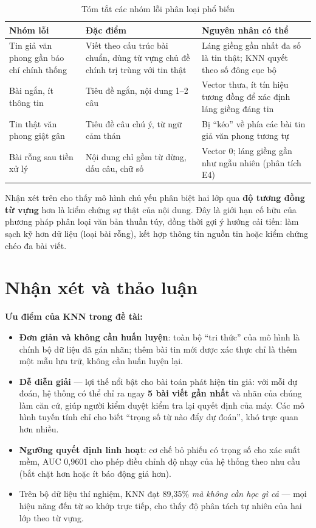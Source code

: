 \begin{table}[H]
\centering
\caption{Tóm tắt các nhóm lỗi phân loại phổ biến}
\label{tab:phan-tich-loi}
\begin{tabular}{|p{4.5cm}|p{5cm}|p{3.5cm}|}
\hline
\textbf{Nhóm lỗi} & \textbf{Đặc điểm} & \textbf{Nguyên nhân có thể} \\
\hline
Tin giả văn phong gần báo chí chính thống & Viết theo cấu trúc bài chuẩn, dùng từ vựng chủ đề chính trị trùng với tin thật & Láng giềng gần nhất đa số là tin thật; KNN quyết theo số đông cục bộ \\
\hline
Bài ngắn, ít thông tin & Tiêu đề ngắn, nội dung 1--2 câu & Vector thưa, ít tín hiệu tương đồng để xác định láng giềng đáng tin \\
\hline
Tin thật văn phong giật gân & Tiêu đề câu chú ý, từ ngữ cảm thán & Bị ``kéo'' về phía các bài tin giả văn phong tương tự \\
\hline
Bài rỗng sau tiền xử lý & Nội dung chỉ gồm từ dừng, dấu câu, chữ số & Vector 0; láng giềng gần như ngẫu nhiên (phân tích E4) \\
\hline
\end{tabular}
\end{table}

Nhận xét trên cho thấy mô hình chủ yếu phân biệt hai lớp qua \textbf{độ tương đồng từ vựng} hơn là kiểm chứng sự thật của nội dung. Đây là giới hạn cố hữu của phương pháp phân loại văn bản thuần túy, đồng thời gợi ý hướng cải tiến: làm sạch kỹ hơn dữ liệu (loại bài rỗng), kết hợp thông tin nguồn tin hoặc kiểm chứng chéo đa bài viết.

\section{Nhận xét và thảo luận}
\label{sec:nhan-xet}

\textbf{Ưu điểm của KNN trong đề tài:}

\begin{itemize}
    \item \textbf{Đơn giản và không cần huấn luyện}: toàn bộ ``tri thức'' của mô hình là chính bộ dữ liệu đã gán nhãn; thêm bài tin mới được xác thực chỉ là thêm một mẫu lưu trữ, không cần huấn luyện lại.
    \item \textbf{Dễ diễn giải} --- lợi thế nổi bật cho bài toán phát hiện tin giả: với mỗi dự đoán, hệ thống có thể chỉ ra ngay \textbf{5 bài viết gần nhất} và nhãn của chúng làm căn cứ, giúp người kiểm duyệt kiểm tra lại quyết định của máy. Các mô hình tuyến tính chỉ cho biết ``trọng số từ nào đẩy dự đoán'', khó trực quan hơn nhiều.
    \item \textbf{Ngưỡng quyết định linh hoạt}: cơ chế bỏ phiếu có trọng số cho xác suất mềm, AUC 0,9601 cho phép điều chỉnh độ nhạy của hệ thống theo nhu cầu (bắt chặt hơn hoặc ít báo động giả hơn).
    \item Trên bộ dữ liệu thí nghiệm, KNN đạt 89,35\% \textit{mà không cần học gì cả} --- mọi hiệu năng đến từ so khớp trực tiếp, cho thấy độ phân tách tự nhiên của hai lớp theo từ vựng.
\end{itemize}

